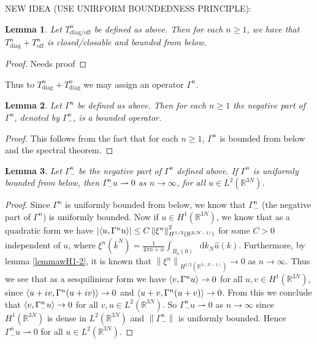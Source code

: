 \documentclass[a4paper,11pt]{article}
\newcommand{\norm}[1]{\left\lVert #1 \right\rVert}
\newcommand{\abs}[1]{\left\lvert #1 \right\rvert}
\newcommand*\diff{\mathop{}\!\mathrm{d}}
\newcommand{\R}{\mathbb{R}}
\newtheorem{lemma}{Lemma}
\numberwithin{equation}{section}
\begin{document}
	NEW IDEA (USE UNIRFORM BOUNDEDNESS PRINCIPLE):\\
	\begin{lemma}
		Let $ T^n_{\text{diag/off}} $ be defined as above. Then for each $ n\geq1 $, we have that $  T^n_{\text{diag}}+T^n_{\text{off}}  $ is closed/closable and bounded from below.
	\end{lemma}
	\begin{proof}
		Needs proof
	\end{proof}
	Thus to $ T^n_{\text{diag}}+T^n_{\text{diag}} $ we may assign an operator $ \Gamma^n $.
	\begin{lemma}\label{lemmaGammaNegativePartBounded}
		Let $ \Gamma^n $ be defined as above. Then for each $ n\geq1 $ the negative part of $ \Gamma^n $, denoted by $ \Gamma^n_- $, is a bounded operator.
	\end{lemma}
	\begin{proof}
		This follows from the fact that for each $ n\geq1 $, $ \Gamma^n $ is bounded from below and the spectral theorem.
	\end{proof}
	\begin{lemma}\label{lemmaGammaBoundednessWeakConvergence1}
			Let $ \Gamma^n_- $ be the negative part of $ \Gamma^n $ defined above. If $ \Gamma^n $ is uniformly bounded from below, then $ \Gamma^n_- u\rightharpoonup0 $ as $ n\to\infty $, for all $ u\in L^2(\R^{3N}) $.
	\end{lemma}
	\begin{proof}
		Since $ \Gamma^n $ is uniformly bounded from below, we know that $ \Gamma^n_- $ (the negative part of $ \Gamma^n $) is uniformly bounded. Now if $ u\in H^1(\R^{3N}) $, we know that as a quadratic form we have $ \abs{\braket{u,\Gamma^nu}}\leq C \norm{\xi^n}^2_{H^{1/2}(\R^{3(N-1)})} $ for some $ C>0 $ independent of $ u $, where $ \xi^n(\bar{k}^N)=\frac{1}{4\pi n+\alpha}\int_{B_n(0)}\diff k_N \hat{u}(k) $. Furthermore, by lemma \ref{lemmawH1-2}, it is known that $ \norm{\xi^n}_{H^{1/2}(\R^{3(N-1)})}\to0 $ as $ n\to\infty $. Thus we see that as a sesquiliniear form we have $ \braket{v,\Gamma^n u}\to0 $ for all $ u,v\in H^1(\R^{3N}) $, since $ \braket{u+iv,\Gamma^n (u+iv)}\to0 $ and $ \braket{u+v,\Gamma^n (u+v)}\to0 $. From this we conclude that $ \braket{v,\Gamma^n_-u}\to 0 $ for all $ v,u\in L^2(\R^{3N}) $. So $ \Gamma^n_-u\rightharpoonup0 $ as $ n\to\infty $ since $ H^1(\R^{3N}) $ is dense in $ L^2(\R^{3N}) $ and $ \norm{\Gamma^n_-} $ is uniformly bounded. Hence $ \Gamma^n_-u\rightharpoonup0 $ for all $ u\in L^2(\R^{3N}) $.
	\end{proof}
\end{document}
